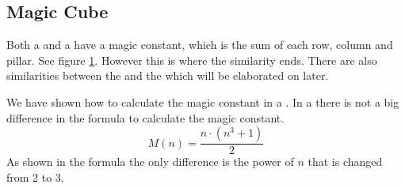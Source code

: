 \subsection{Magic Cube}
\label{sub:mcube}


\begin{figure}[hbt]
	\centering
		\hspace{0.02\textwidth}
		\hspace{0.02\textwidth}
		\caption{}
		\label{fig:presentMagicCube}
\end{figure}



Both a \msquare{} and a \mcube{} have a magic constant, which is the sum of each row, column and pillar. See figure \ref{fig:presentMagicCube}.
However this is where the similarity ends. There are also similarities between the \mcube{} and the \rubik{} which will be elaborated on later. 

We have shown how to calculate the magic constant in a \msquare{}.
In a \mcube{} there is not a big difference in the formula to calculate the magic constant.
\begin{equation}
	M(n)=\frac{n \cdot (n^3+1)}{2}
\end{equation}
As shown in the formula the only difference is the power of $n$ that is changed from 2 to 3.

